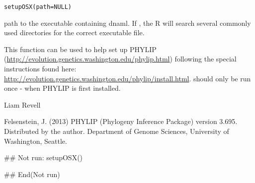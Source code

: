 \documentclass[a4paper]{book}
\begin{document}
%
\begin{Usage}
\begin{verbatim}
setupOSX(path=NULL)
\end{verbatim}
\end{Usage}
%
\begin{Arguments}
\begin{ldescription}
\item[\code{path}] path to the executable containing dnaml. If , the R will search several commonly used directories for the correct executable file.
\end{ldescription}
\end{Arguments}
%
\begin{Details}\relax
This function can be used to help set up PHYLIP (\url{http://evolution.genetics.washington.edu/phylip.html}) following the special instructions found here: \url{http://evolution.genetics.washington.edu/phylip/install.html}.  should only be run once - when PHYLIP is first installed.
\end{Details}
%
\begin{Author}\relax
Liam Revell 
\end{Author}
%
\begin{References}\relax
Felsenstein, J. (2013) PHYLIP (Phylogeny Inference Package) version 3.695. Distributed by the author. Department of Genome Sciences, University of Washington, Seattle.
\end{References}
%
\begin{Examples}
\begin{ExampleCode}
## Not run: 
setupOSX()

## End(Not run)
\end{ExampleCode}
\end{Examples}
\printindex{}
\end{document}
